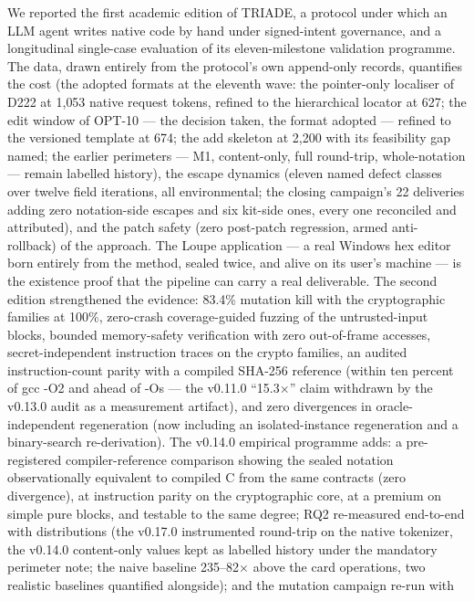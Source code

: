 \documentclass[11pt,a4paper]{article}
\begin{document}
We reported the first academic edition of TRIADE, a protocol under which
an LLM agent writes native code by hand under signed-intent governance,
and a longitudinal single-case evaluation of its eleven-milestone
validation programme. The data, drawn entirely from the protocol's own
append-only records, quantifies the cost (the adopted formats at the
eleventh wave: the pointer-only localiser of D222 at 1{,}053 native
request tokens, refined to the hierarchical locator at 627; the edit
window of OPT-10 --- the decision taken, the format adopted ---
refined to the versioned template at 674; the add skeleton at
2{,}200 with its feasibility gap named; the earlier perimeters --- M1,
content-only, full round-trip, whole-notation --- remain labelled
history), the
escape dynamics (eleven named defect classes over twelve field
iterations, all environmental; the closing campaign's 22 deliveries
adding zero notation-side escapes and six kit-side ones, every one
reconciled and attributed), and the patch safety (zero
post-patch regression, armed anti-rollback) of the approach. The Loupe
application --- a real Windows hex editor born entirely from the method,
sealed twice, and alive on its user's machine --- is the existence proof
that the pipeline can carry a real deliverable. The second edition strengthened the
evidence: 83.4\% mutation kill with the cryptographic families at
100\%, zero-crash coverage-guided fuzzing of the untrusted-input blocks,
bounded memory-safety verification with zero out-of-frame accesses,
secret-independent instruction traces on the crypto families, an audited
instruction-count parity with a compiled SHA-256 reference (within ten
percent of gcc -O2 and ahead of -Os --- the v0.11.0 ``15.3$\times$''
claim withdrawn by the v0.13.0 audit as a measurement artifact), and zero divergences in oracle-independent regeneration (now including an
isolated-instance regeneration and a binary-search re-derivation). The v0.14.0 empirical programme
adds: a pre-registered compiler-reference comparison showing the sealed
notation observationally equivalent to compiled C from the same contracts
(zero divergence), at instruction parity on the cryptographic core, at a
premium on simple pure blocks, and testable to the same degree; RQ2
re-measured end-to-end with distributions (the v0.17.0 instrumented
round-trip on the native tokenizer, the v0.14.0 content-only values
kept as labelled history under the mandatory perimeter note; the naive
baseline 235--82$\times$ above the card operations, two realistic
baselines quantified alongside); and the mutation campaign re-run with
\end{document}
